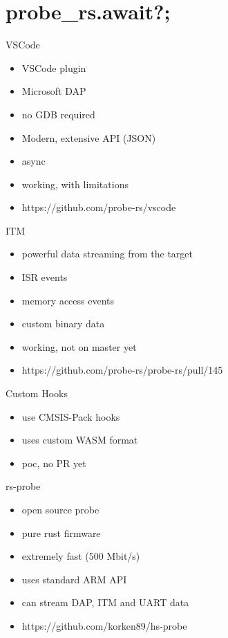 \documentclass[aspectratio=1610,14pt,t]{beamer}
\begin{document}
\section{probe\_rs.await?;}

\begin{frame}[c,fragile]{VSCode}
  \begin{itemize}
    \item VSCode plugin
    \item Microsoft DAP
    \item no GDB required
    \item Modern, extensive API (JSON)
    \item async
    \item working, with limitations
    \item https://github.com/probe-rs/vscode
  \end{itemize}
\end{frame}

\begin{frame}[c,fragile]{ITM}
  \begin{itemize}
    \item powerful data streaming from the target
    \item ISR events
    \item memory access events
    \item custom binary data
    \item working, not on master yet
    \item https://github.com/probe-rs/probe-rs/pull/145
  \end{itemize}
\end{frame}

\begin{frame}[c,fragile]{Custom Hooks}
  \begin{itemize}
    \item use CMSIS-Pack hooks
    \item uses custom WASM format
    \item poc, no PR yet
  \end{itemize}
\end{frame}

\begin{frame}[c,fragile]{rs-probe}
  \begin{itemize}
    \item open source probe
    \item pure rust firmware
    \item extremely fast (500 Mbit/s)
    \item uses standard ARM API
    \item can stream DAP, ITM and UART data
    \item https://github.com/korken89/hs-probe
  \end{itemize}
\end{frame}
\end{document}
